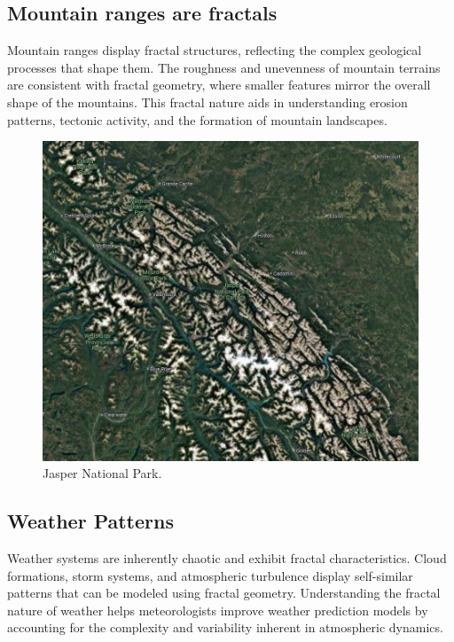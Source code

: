 \documentclass[12pt]{article}
\begin{document}
\newpage

\subsection{Mountain ranges are fractals}
Mountain ranges display fractal structures, reflecting the complex geological processes that shape them. The roughness and unevenness of mountain terrains are consistent with fractal geometry, where smaller features mirror the overall shape of the mountains. This fractal nature aids in understanding erosion patterns, tectonic activity, and the formation of mountain landscapes.

\begin{figure}[H]
\centering
\includegraphics[width=\textwidth]{assets/fractal-jasper.png}
\caption{Jasper National Park.}
\label{fig:fractal-jasper}
\end{figure}

\newpage

\subsection{Weather Patterns}
Weather systems are inherently chaotic and exhibit fractal characteristics. Cloud formations, storm systems, and atmospheric turbulence display self-similar patterns that can be modeled using fractal geometry. Understanding the fractal nature of weather helps meteorologists improve weather prediction models by accounting for the complexity and variability inherent in atmospheric dynamics.
\end{document}
